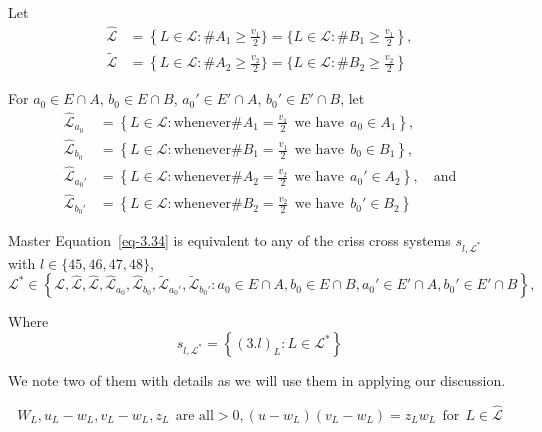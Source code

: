 \documentclass[a4paper,12pt]{article}
\theoremstyle{definition}
\theoremstyle{underlinethm}
\theoremstyle{definition}
\begin{document}
\begin{enumerate}[label=(\alph*)]
Let
\begin{align*}
\hat{\mathcal{L}} & = \left\{L \in  \mathcal{L} : \# A_{1} \geq \frac{v_{1}}{2}\} = \{L \in \mathcal{L} : \# B_{1} \geq \frac{v_{1}}{2}\right\},\\
\widetilde{\mathcal{L}} & = \left\{L \in \mathcal{L}  : \# A_{2} \geq \frac{v_{2}}{2}\} = \{L \in \mathcal{L} : \# B_{2} \geq \frac{v_{2}}{2}\right\}
\end{align*}

For $a_{0} \in E \cap A$, $b_{0} \in E \cap B$, $a_{0}' \in E' \cap A$, $b_{0}' \in E' \cap B$, let
\begin{align*}
\hat{\mathcal{L}}_{a_{0}} & = \left\{L \in  \mathcal{L} : \text{whenever} \# A_{1} = \frac{v_{1}}{2}~~ \text{we have}~~ a_{0} \in A_{1} \right\},\\
\hat{\mathcal{L}}_{b_{0}} & = \left\{L \in  \mathcal{L} : \text{whenever} \# B_{1} = \frac{v_{1}}{2}~~ \text{we have}~~ b_{0} \in B_{1} \right\},\\
\hat{\mathcal{L}}_{a_{0}'} & = \left\{L \in  \mathcal{L} : \text{whenever} \# A_{2} = \frac{v_{2}}{2}~~ \text{we have}~~ a_{0}' \in A_{2} \right\},\quad \text{and}\\
\hat{\mathcal{L}}_{b_{0}'} & = \left\{L \in  \mathcal{L} : \text{whenever} \# B_{2} = \frac{v_{2}}{2}~~ \text{we have}~~ b_{0}' \in B_{2} \right\}
\end{align*}
 
Master Equation~\eqref{eq-3.34} is equivalent to any of the criss cross systems $s_{l, \mathcal{L}^{\ast}}$ with $l \in \{45,46, 47, 48 \}$,
{\fontsize{10.5}{12.5}\selectfont
\begin{equation*}
\mathcal{L}^{\ast} \in \left\{\mathcal{L}, \hat{\mathcal{L}}, \hat{\mathcal{L}}, \hat{\mathcal{L}}_{a_{0}}, \hat{\mathcal{L}}_{b_{0}}, \widetilde{\mathcal{L}}_{a_{0}'}, \widetilde{\mathcal{L}}_{b_{0}'} : a_{0} \in E \cap A, b_{0} \in E \cap B, a_{0}' \in E' \cap A, b_{0}' \in E' \cap B \right\},
\end{equation*} }

Where
\begin{equation}
s_{l, \mathcal{L}^{\ast}} = \left\{(3.l)_{L} : L \in \mathcal{L}^{*} \right\}\tag{3.49}\label{eq-3.49}
\end{equation}

We note two of them with details as we will use them in applying our discussion.

\begin{equation}
W_{L}, u_{L}-w_{L}, v_{L}-w_{L}, z_{L}~~\text{are all} > 0, (u -w_{L})(v_{L}-w_{L}) =z_{L} w_{L}~~\text{for}~~ L \in \hat{\mathcal{L}}\tag{3.50}\label{eq-3.50}
\end{equation}
  

\end{enumerate}
\end{document}
